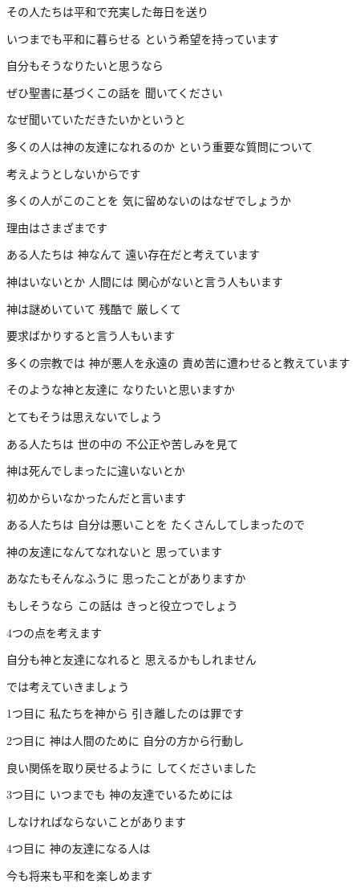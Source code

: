 \documentclass[twocolumn]{jsarticle}
\begin{document}
その人たちは平和で充実した毎日を送り

いつまでも平和に暮らせる
という希望を持っています

自分もそうなりたいと思うなら

ぜひ聖書に基づくこの話を
聞いてください

なぜ聞いていただきたいかというと

多くの人は神の友達になれるのか
という重要な質問について

考えようとしないからです

多くの人がこのことを
気に留めないのはなぜでしょうか

理由はさまざまです

ある人たちは 神なんて
遠い存在だと考えています

神はいないとか 人間には
関心がないと言う人もいます

神は謎めいていて 残酷で 厳しくて

要求ばかりすると言う人もいます

多くの宗教では 神が悪人を永遠の
責め苦に遭わせると教えています

そのような神と友達に
なりたいと思いますか

とてもそうは思えないでしょう

ある人たちは 世の中の
不公正や苦しみを見て

神は死んでしまったに違いないとか

初めからいなかったんだと言います

ある人たちは 自分は悪いことを
たくさんしてしまったので

神の友達になんてなれないと
思っています

あなたもそんなふうに
思ったことがありますか

もしそうなら この話は
きっと役立つでしょう

4つの点を考えます

自分も神と友達になれると
思えるかもしれません

では考えていきましょう

1つ目に 私たちを神から
引き離したのは罪です

2つ目に 神は人間のために
自分の方から行動し

良い関係を取り戻せるように
してくださいました

3つ目に いつまでも
神の友達でいるためには

しなければならないことがあります

4つ目に 神の友達になる人は

今も将来も平和を楽しめます
\end{document}
